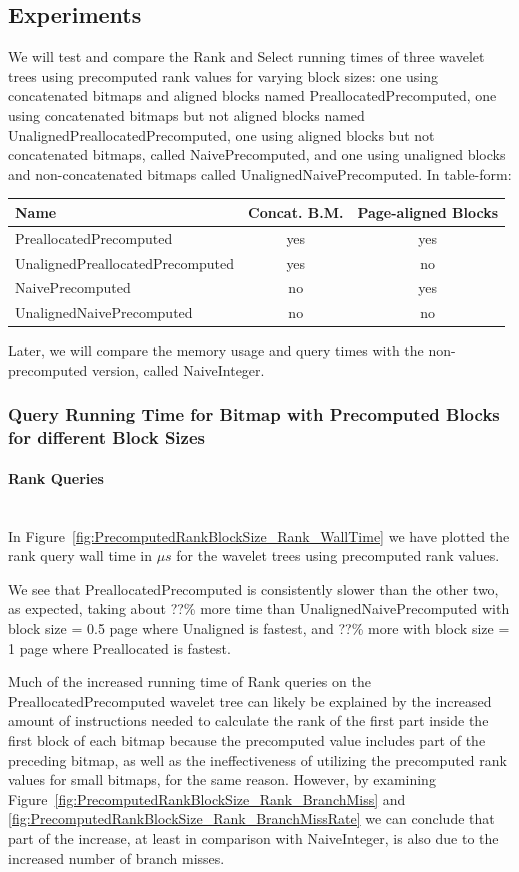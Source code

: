 \subsection{Experiments}
We will test and compare the Rank and Select running times of three wavelet trees using precomputed rank values for varying block sizes: one using concatenated bitmaps and aligned blocks named PreallocatedPrecomputed, one using concatenated bitmaps but not aligned blocks named UnalignedPreallocatedPrecomputed, one using aligned blocks but not concatenated bitmaps, called NaivePrecomputed,
and one using unaligned blocks and non-concatenated bitmaps called UnalignedNaivePrecomputed.
In table-form:\\
\begin{tabular}{|lcc|}
\hline
Name							& Concat. B.M.	& Page-aligned Blocks	\\ \hline
PreallocatedPrecomputed		& yes			& yes					\\ \hline
UnalignedPreallocatedPrecomputed	& yes		& no						\\ \hline
NaivePrecomputed				& no				& yes					\\ \hline
UnalignedNaivePrecomputed	& no				& no						\\ \hline
\end{tabular}
Later, we will compare the memory usage and query times with the non-precomputed version, called NaiveInteger.

\subsubsection{Query Running Time for Bitmap with Precomputed Blocks for different Block Sizes}
\label{sec:queryRunTimePrecomputedBlockSizes}

\paragraph{Rank Queries}~\\
In Figure~\ref{fig:PrecomputedRankBlockSize_Rank_WallTime} we have plotted the rank query wall time in $\mu s$ for the wavelet trees using precomputed rank values.

We see that PreallocatedPrecomputed is consistently slower than the other two, as expected, taking about ??\% more time than UnalignedNaivePrecomputed with block size = 0.5 page where Unaligned is fastest, and ??\% more with block size = 1 page where Preallocated is fastest.

Much of the increased running time of Rank queries on the PreallocatedPrecomputed wavelet tree can likely be explained by the increased amount of instructions needed to calculate the rank of the first part inside the first block of each bitmap because the precomputed value includes part of the preceding bitmap, as well as the ineffectiveness of utilizing the precomputed rank values for small bitmaps, for the same reason.
However, by examining Figure~\ref{fig:PrecomputedRankBlockSize_Rank_BranchMiss} and \ref{fig:PrecomputedRankBlockSize_Rank_BranchMissRate} we can conclude that part of the increase, at least in comparison with NaiveInteger, is also due to the increased number of branch misses.

